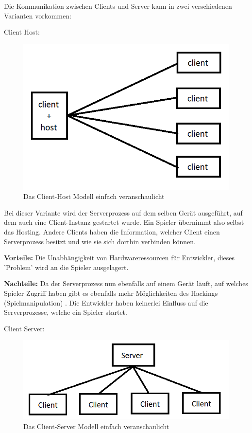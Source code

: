 Die Kommunikation zwischen Clients und Server kann in zwei verschiedenen Varianten vorkommen:

\textsf{\Large Client Host:}

\begin{figure}
	\centering
	\includegraphics{images/Client_Host.png}
	\caption[Client-Server Modell]{Das Client-Host Modell einfach veranschaulicht}
	\label{pic:Client_Host}
\end{figure}




Bei dieser Variante wird der Serverprozess auf dem selben Gerät ausgeführt, auf dem auch eine Client-Instanz gestartet wurde. Ein Spieler übernimmt also selbst das Hosting. Andere Clients haben die Information, welcher Client einen Serverprozess besitzt und wie sie sich dorthin verbinden können. 

\textbf{Vorteile:} Die Unabhängigkeit von Hardwareressourcen für Entwickler, dieses 'Problem' wird an die Spieler ausgelagert. 

\textbf{Nachteile:} Da der Serverprozess nun ebenfalls auf einem Gerät läuft, auf welches Spieler Zugriff haben gibt es ebenfalls mehr Möglichkeiten des Hackings (Spielmanipulation) \cite{Wikipedia.2021h}. Die Entwickler haben keinerlei Einfluss auf die Serverprozesse, welche ein Spieler startet.
\cite{Smed.2002}

\textsf{\Large Client Server:}

\begin{figure}
\centering
\includegraphics{images/Client_Server.png}
\caption[Client-Server Modell]{Das Client-Server Modell einfach veranschaulicht}
\label{pic:Client_Server}
\end{figure}



